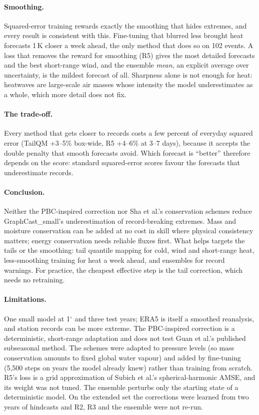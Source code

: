 \documentclass{article}
\newcommand{\R}[1]{\textsf{R#1}}
\begin{document}
\paragraph{Smoothing.}
Squared-error training rewards exactly the smoothing that hides extremes, and every result is consistent with this. Fine-tuning that blurred less brought heat forecasts 1\,K closer a week ahead,
the only method that does so on 102 events. A loss that removes the reward for smoothing (\R{5}) gives the most detailed forecasts and the best short-range wind, and the ensemble
\emph{mean}, an explicit average over uncertainty, is the mildest forecast of all. Sharpness alone is not enough for heat: heatwaves are large-scale air masses whose
intensity the model underestimates as a whole, which more detail does not fix.

\paragraph{The trade-off.}
Every method that gets closer to records costs a few percent of everyday squared error (TailQM +3--5\% box-wide, \R{5} +4--6\% at 3--7 days), because it accepts
the double penalty that smooth forecasts avoid. Which forecast is ``better'' therefore depends on the score: standard squared-error scores favour the forecasts that
underestimate records.

\paragraph{Conclusion.}
Neither the PBC-inspired correction nor Sha et al.'s conservation schemes reduce GraphCast\_small's underestimation of record-breaking extremes. Mass and moisture
conservation can be added at no cost in skill where physical consistency matters; energy conservation needs reliable fluxes first. What helps targets the tails or
the smoothing: tail quantile mapping for cold, wind and short-range heat, less-smoothing training for heat a week ahead, and ensembles for record warnings.
For practice, the cheapest effective step is the tail correction, which needs no retraining.

\paragraph{Limitations.}
One small model at 1$^\circ$ and three test years; ERA5 is itself a smoothed reanalysis, and station records can be more extreme. The PBC-inspired correction is a deterministic,
short-range adaptation and does not test Guan et al.'s published subseasonal method. The schemes were adapted to pressure levels (so mass conservation amounts to fixed global
water vapour) and added by fine-tuning (5{,}500 steps on years the model already knew) rather than training from scratch. \R{5}'s loss is a grid approximation of Subich et al.'s
spherical-harmonic AMSE, and its weight was not tuned. The ensemble perturbs only the starting state of a deterministic model. On the extended set the corrections were learned
from two years of hindcasts and \R{2}, \R{3} and the ensemble were not re-run.
\end{document}
